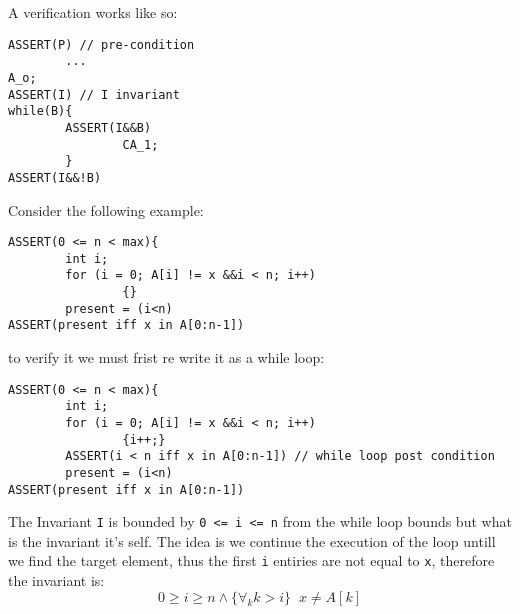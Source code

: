 \documentclass[12pt]{book}
\begin{document}
A verification works like so:
\begin{verbatim}
ASSERT(P) // pre-condition
        ...
A_o;
ASSERT(I) // I invariant
while(B){
        ASSERT(I&&B)
                CA_1;
        }
ASSERT(I&&!B)
\end{verbatim}
Consider the following example:
\begin{verbatim}
ASSERT(0 <= n < max){
        int i;
        for (i = 0; A[i] != x &&i < n; i++)
                {}
        present = (i<n)
ASSERT(present iff x in A[0:n-1])
\end{verbatim}
to verify it we must frist re write it as a while loop:
\begin{verbatim}
ASSERT(0 <= n < max){
        int i;
        for (i = 0; A[i] != x &&i < n; i++)
                {i++;}
        ASSERT(i < n iff x in A[0:n-1]) // while loop post condition
        present = (i<n)
ASSERT(present iff x in A[0:n-1])
\end{verbatim}
The Invariant \texttt{I} is bounded by \texttt{0 <= i <= n} from the while loop 
bounds but what is the invariant it's self. The idea is we continue the 
execution of the loop untill we find the target element, thus the first \texttt{i}
entiries are not equal to \texttt{x}, therefore the invariant is:
\[0 \geq i \geq n \wedge \{\forall_k k > i\}\;\;x \neq A[k]\]
\end{document}
